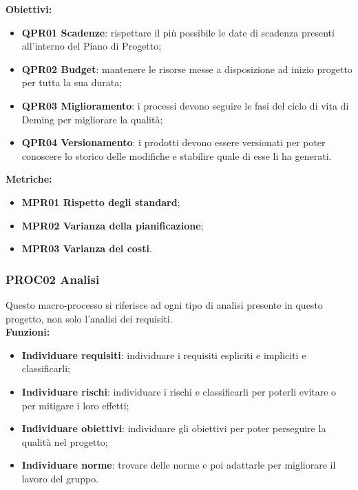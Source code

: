 \documentclass[../piano_di_qualifica.tex]{subfiles}
\begin{document}
\textbf{Obiettivi:}
\smallbreak
\begin{itemize}
	\item \textbf{QPR01 Scadenze}: rispettare il più possibile le date di scadenza presenti all'interno del Piano di Progetto;
	\item \textbf{QPR02 Budget}: mantenere le risorse messe a disposizione ad inizio progetto per tutta la sua durata;
	\item \textbf{QPR03 Miglioramento}: i processi devono seguire le fasi del ciclo di vita di Deming per migliorare la qualità;
	\item \textbf{QPR04 Versionamento}: i prodotti devono essere versionati per poter conoscere lo storico delle modifiche e stabilire quale di esse li ha generati.
\end{itemize}

\textbf{Metriche:}
\smallbreak
\begin{itemize}
	\item \textbf{MPR01 Rispetto degli standard};
	\item \textbf{MPR02 Varianza della pianificazione};
	\item \textbf{MPR03 Varianza dei costi}.
\end{itemize}

\subsubsection{PROC02 Analisi}
Questo macro-processo si riferisce ad ogni tipo di analisi presente in questo progetto, non solo l'analisi dei requisiti. \\

\textbf{Funzioni:}
\smallbreak
\begin{itemize}
	\item \textbf{Individuare requisiti}: individuare i requisiti espliciti e impliciti e classificarli;
	\item \textbf{Individuare rischi}: individuare i rischi e classificarli per poterli evitare o per mitigare i loro effetti;
	\item \textbf{Individuare obiettivi}: individuare gli obiettivi per poter perseguire la qualità nel progetto;
	\item \textbf{Individuare norme}: trovare delle norme e poi adattarle per migliorare il lavoro del gruppo.
\end{itemize}
\end{document}
